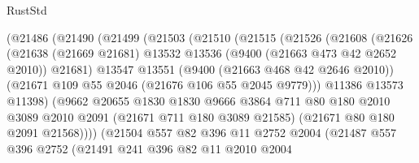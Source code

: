 \begin{lexlean}{RustStd}
\begin{coremodule}
                        (@21486
                          (@21490
                            (@21499
                              (@21503
                                (@21510
                                  (@21515
                                    (@21526
                                      (@21608
                                        (@21626
                                          (@21638
                                            (@21669 @21681)
                                            @13532
                                            @13536
                                            (@9400 (@21663 @473 @42 @2652 @2010))
                                            @21681)
                                          @13547
                                          @13551
                                          (@9400 (@21663 @468 @42 @2646 @2010))
                                          (@21671 @109 @55 @2046 (@21676 @106 @55 @2045 @9779)))
                                        @11386
                                        @13573
                                        @11398)
                                      (@9662
                                        @20655
                                        @1830
                                        @1830
                                        @9666
                                        @3864
                                        @711
                                        @80
                                        @180
                                        @2010
                                        @3089
                                        @2010
                                        @2091
                                        (@21671 @711 @180 @3089 @21585)
                                        (@21671 @80 @180 @2091 @21568))))
                                  (@21504
                                    @557
                                    @82
                                    @396
                                    @11
                                    @2752
                                    @2004
                                    (@21487
                                      @557
                                      @396
                                      @2752
                                      (@21491
                                        @241
                                        @396
                                        @82
                                        @11
                                        @2010
                                        @2004

\end{coremodule}
\end{lexlean}
